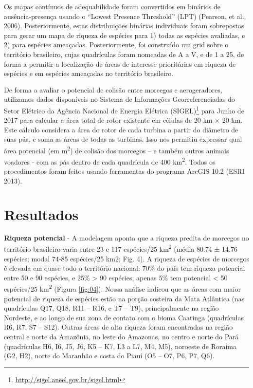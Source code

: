\documentclass[
  oneside]{scrbook}
\DeclareRobustCommand{\href}[2]{#2\footnote{\url{#1}}}
\begin{document}
Os mapas contínuos de adequabilidade foram convertidos em binários de ausência-presença usando o ``Lowest Presence Threshold'' (LPT) (Pearson, et al., 2006). Posteriormente, estas distribuições binárias individuais foram sobrepostas para gerar um mapa de riqueza de espécies para 1) todas as espécies avaliadas, e 2) para espécies ameaçadas. Posteriormente, foi construído um grid sobre o território brasileiro, cujas quadrículas foram nomeadas de A a V, e de 1 a 25, de forma a permitir a localização de áreas de interesse prioritárias em riqueza de espécies e em espécies ameaçadas no território brasileiro.

De forma a avaliar o potencial de colisão entre morcegos e aerogeradores, utilizamos dados disponíveis no \href{http://sigel.aneel.gov.br/sigel.html}{Sistema de Informações Georreferenciadas do Setor Elétrico da Agência Nacional de Energia Elétrica (SIGEL)} para Junho de 2017 para calcular a área total de rotor existente em células de 20 km × 20 km. Este cálculo considera a área do rotor de cada turbina a partir do diâmetro de suas pás, e soma as áreas de todas as turbinas. Isso nos permitiu expressar qual área potencial (em m\textsuperscript{2}) de colisão dos morcegos -- e também outros animais voadores - com as pás dentro de cada quadrícula de 400 km\textsuperscript{2}. Todos os procedimentos foram feitos usando ferramentas do programa ArcGIS 10.2 (ESRI 2013).

\hypertarget{resultados-morcegos}{%
\section{Resultados}\label{resultados-morcegos}}

\textbf{Riqueza potencial} - A modelagem aponta que a riqueza predita de morcegos no território brasileiro varia entre 23 e 117 espécies/25 km\textsuperscript{2} (média 80.74 ± 14.76 espécies; modal 74-85 espécies/25 km2; Fig. 4). A riqueza de espécies de morcegos é elevada em quase todo o território nacional: 70\% do país tem riqueza potencial entre 50 e 90 espécies, e 25\% \textgreater{} 90 espécies; apenas 5\% tem potencial \textless{} 50 espécies/25 km\textsuperscript{2} (Figura \ref{fig:04}). Nossa análise indicou que as áreas com maior potencial de riqueza de espécies estão na porção costeira da Mata Atlântica (nas quadrículas Q17, Q18, R11 -- R16, e T7 -- T9), principalmente na região Nordeste, e ao longo de sua zona de contato com o bioma Caatinga (quadrículas R6, R7, S7 -- S12). Outras áreas de alta riqueza foram encontradas na região central e norte da Amazônia, no leste do Amazonas, no centro e norte do Pará (quadrículas H6, I6, J5, J6, K5 -- K7, L3 a L7, M4, M5), noroeste de Roraima (G2, H2), norte do Maranhão e costa do Piauí (O5 -- O7, P6, P7, Q6).
\end{document}
